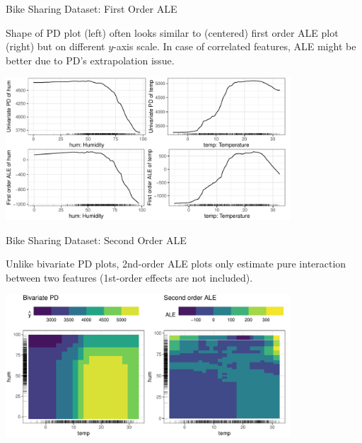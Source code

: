 \documentclass[11pt,compress,t,notes=noshow, aspectratio=169, xcolor=table]{beamer}
\begin{document}
\begin{frame}{Bike Sharing Dataset: First Order ALE}

Shape of PD plot (left) often looks similar to (centered) first order ALE plot (right) but on different $y$-axis scale.
In case of correlated features, ALE might be better due to PD's extrapolation issue.


\begin{center}
\includegraphics[width=0.8\textwidth]{figure/ale1d}
\end{center}


\end{frame}


\begin{frame}{Bike Sharing Dataset: Second Order ALE}

Unlike bivariate PD plots, 2nd-order ALE plots only estimate pure interaction between two features (1st-order effects are not included).

\vspace{0.1cm}

\begin{center}
\includegraphics[width=0.8\textwidth]{figure/ale2d}
\end{center}

\end{frame}
\end{document}
